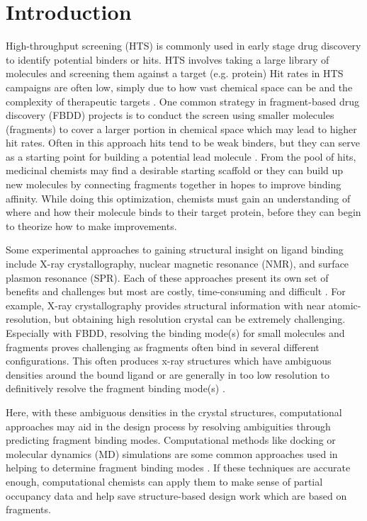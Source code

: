 \section{Introduction}
High-throughput screening (HTS) is commonly used in early stage drug discovery to identify potential binders or hits.
HTS involves taking a large library of molecules and screening them against a target (e.g. protein)
Hit rates in HTS campaigns are often low, simply due to how vast chemical space can be and the complexity of therapeutic targets \cite{erlanson_introduction_2012}.
One common strategy in fragment-based drug discovery (FBDD) projects is to conduct the screen using smaller molecules (fragments) to cover a larger portion in chemical space which may lead to higher hit rates.
Often in this approach hits tend to be weak binders, but they can serve as a starting point for building a potential lead molecule \cite{erlanson_tethering:_2004}.
From the pool of hits, medicinal chemists may find a desirable starting scaffold or they can build up new molecules by connecting fragments together in hopes to improve binding affinity.
While doing this optimization, chemists must gain an understanding of where and how their molecule binds to their target protein, before they can begin to theorize how to make improvements.

Some experimental approaches to gaining structural insight on ligand binding include X-ray crystallography, nuclear magnetic resonance (NMR), and surface plasmon resonance (SPR).
Each of these approaches present its own set of benefits and challenges but most are costly, time-consuming and difficult \cite{jhoti_fragment-based_2007, gozalbes_contributions_2010}.
For example, X-ray crystallography provides structural information with near atomic-resolution, but obtaining high resolution crystal can be extremely challenging.
Especially with FBDD, resolving the binding mode(s) for small molecules and fragments proves challenging as fragments often bind in several different configurations.
This often produces x-ray structures which have ambiguous densities around the bound ligand or are generally in too low resolution to definitively resolve the fragment binding mode(s) \cite{domagalski_quality_2014}.

Here, with these ambiguous densities in the crystal structures, computational approaches may aid in the design process by resolving ambiguities through predicting fragment binding modes.
Computational methods like docking or molecular dynamics (MD) simulations are some common approaches used in helping to determine fragment binding modes \cite{Rocklin2013BlindSite, durrant_computer-aided_2010, sliwoski_computational_2014}.
If these techniques are accurate enough, computational chemists can apply them to make sense of partial occupancy data and help save structure-based design work which are based on fragments.


